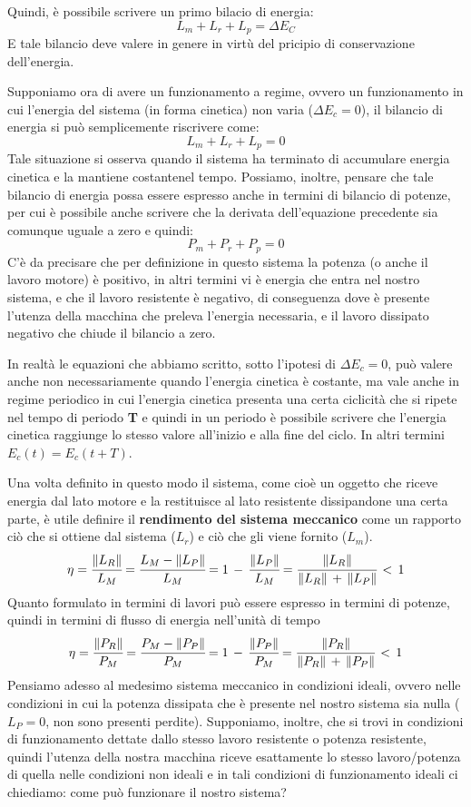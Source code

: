 Quindi, è possibile scrivere un primo bilacio di energia:
\[L_m + L_r + L_p = \Delta E_C\]
E tale bilancio deve valere in genere in virtù del pricipio di conservazione dell'energia.

Supponiamo ora di avere un funzionamento a regime, ovvero un funzionamento in cui l'energia del sistema (in forma cinetica) non varia ($\Delta E_c = 0$), il bilancio di energia si può semplicemente riscrivere come:
\[L_m + L_r + L_p = 0\] 
Tale situazione si osserva quando il sistema ha terminato di accumulare energia cinetica e la mantiene costantenel tempo. Possiamo, inoltre, pensare che tale bilancio di energia possa essere espresso anche in termini di bilancio di potenze, per cui è possibile anche scrivere che la derivata dell'equazione precedente sia comunque uguale a zero e quindi:
\[P_m + P_r + P_p = 0\]
C'è da precisare che per definizione in questo sistema la potenza (o anche il lavoro motore) è positivo, in altri termini vi è energia che entra nel nostro sistema, e che il lavoro resistente è negativo, di conseguenza dove è presente l'utenza della macchina che preleva l'energia necessaria, e il lavoro dissipato negativo che chiude il bilancio a zero.

In realtà le equazioni che abbiamo scritto, sotto l'ipotesi di $\Delta E_c = 0$, può valere anche non necessariamente quando l'energia cinetica è costante, ma vale anche in regime periodico in cui l'energia cinetica presenta una certa ciclicità che si ripete nel tempo di periodo \textbf{T} e quindi in un periodo è possibile scrivere che l'energia cinetica raggiunge lo stesso valore all'inizio e alla fine del ciclo. In altri termini $E_c(t) = E_c(t+T)$.

Una volta definito in questo modo il sistema, come cioè un oggetto che riceve energia dal lato motore e la restituisce al lato resistente dissipandone una certa parte, è utile definire il \textbf{rendimento del sistema meccanico} come un rapporto ciò che si ottiene dal sistema ($L_r$) e ciò che gli viene fornito ($L_m$).
\[\eta = \cfrac{\lVert L_R\rVert}{L_M} = \cfrac{L_M - \lVert L_P\rVert}{L_M} = 1\,-\,\cfrac{\lVert L_P\rVert}{L_M} = \cfrac{\lVert L_R\rVert}{\lVert L_R\rVert\,+\,\lVert L_P\rVert}\,<\,1\]
Quanto formulato in termini di lavori può essere espresso in termini di potenze, quindi in termini di flusso di energia nell'unità di tempo
\[\eta = \cfrac{\lVert P_R\rVert}{P_M} = \cfrac{P_M - \lVert P_P\rVert}{P_M} = 1\,-\,\cfrac{\lVert P_P\rVert}{P_M} = \cfrac{\lVert P_R\rVert}{\lVert P_R\rVert\,+\,\lVert P_P\rVert}\,<\,1\]
\newline
Pensiamo adesso al medesimo sistema meccanico in condizioni ideali, ovvero nelle condizioni in cui la potenza dissipata che è presente nel nostro sistema sia nulla ($L_P = 0$, non sono presenti perdite). Supponiamo, inoltre, che si trovi in condizioni di funzionamento dettate dallo stesso lavoro resistente o potenza resistente, quindi l'utenza della nostra macchina riceve esattamente lo stesso lavoro/potenza di quella nelle condizioni non ideali e in tali condizioni di funzionamento ideali ci chiediamo: come può funzionare il nostro sistema?

